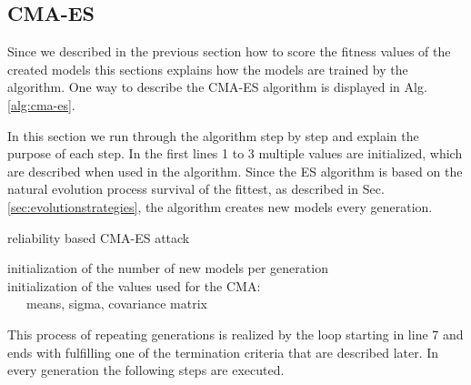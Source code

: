 
\subsection{CMA-ES}
\label{sec:cma-esdesign}

Since we described in the previous section how to score the fitness values of the created models this sections explains how the models are trained by the algorithm.
One way to describe the \ac{CMA-ES} algorithm is displayed in Alg. \ref{alg:cma-es}.

In this section we run through the algorithm step by step and explain the purpose of each step. %
In the first lines 1 to 3 multiple values are initialized, which are described when used in the algorithm.
Since the \ac{ES} algorithm is based on the natural evolution process survival of the fittest, as described in Sec. \ref{sec:evolutionstrategies}, the algorithm creates new models every generation. %

\SetAlCapHSkip{0.2em}
\begin{algorithm}[H] %
\Indm
\SetAlgoLined
\caption{reliability based \acl{CMA-ES} attack}
\label{alg:cma-es}
\Indp

initialization of the number of new models per generation\\
initialization of the values used for the \ac{CMA}:\\
\ \ \ means, sigma, covariance matrix\\
\end{algorithm}

This process of repeating generations is realized by the loop starting in line 7 and ends with fulfilling one of the termination criteria that are described later.
In every generation the following steps are executed.

